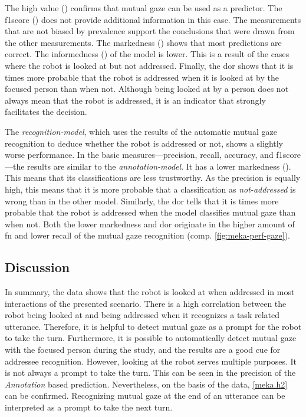 The high value () confirms that mutual gaze can be used as a predictor.
The \gls{f1score} () does not provide additional information in this case.
The measurements that are not biased by \gls{prevalence} support the conclusions that were drawn from the other measurements.
The \gls{markedness} () shows that most predictions are correct. 
The \gls{informedness} () of the model is lower.
This is a result of the cases where the \gls{robot} is looked at but not addressed.
Finally, the \gls{dor} shows that it is  times more probable that the \gls{robot} is addressed when it is looked at by the focused person than when not.
Although being looked at by a person does not always mean that the \gls{robot} is addressed, it is an indicator that strongly facilitates the decision. 

The \emph{recognition-model}, which uses the results of the automatic mutual gaze recognition to deduce whether the \gls{robot} is addressed or not, shows a slightly worse performance.
In the basic measures---\gls{precision}, \gls{recall}, \gls{accuracy}, and \gls{f1score}---the results are similar to the \emph{annotation-model}.
It has a lower \gls{markedness} ().
This means that its classifications are less trustworthy.
As the \gls{precision} is equally high, this means that it is more probable that a classification as \emph{not-addressed} is wrong than in the other model.
Similarly, the \gls{dor} tells that it is  times more probable that the \gls{robot} is addressed when the model classifies mutual gaze than when not.
Both the lower \gls{markedness} and \gls{dor} originate in the higher amount of \acrlong{fn} and lower \gls{recall} of the mutual gaze recognition (comp. \cref{fig:meka-perf-gaze}).

\subsection{Discussion}

In summary, the data shows that the \gls{robot} is looked at when addressed in most interactions of the presented scenario.
There is a high correlation between the \gls{robot} being looked at and being addressed when it recognizes a task related utterance.
Therefore, it is helpful to detect mutual gaze as a prompt for the \gls{robot} to take the \gls{turn}.
Furthermore, it is possible to automatically detect mutual gaze with the focused person during the study, and the results are a good cue for \gls{addressee} recognition.
However, looking at the \gls{robot} serves multiple purposes.
It is not always a prompt to take the \gls{turn}.
This can be seen in the \gls{precision} of the \emph{Annotation} based prediction.
Nevertheless, on the basis of the data, \cref{meka.h2} can be confirmed.
Recognizing mutual gaze at the end of an utterance can be interpreted as a prompt to take the next \gls{turn}.

